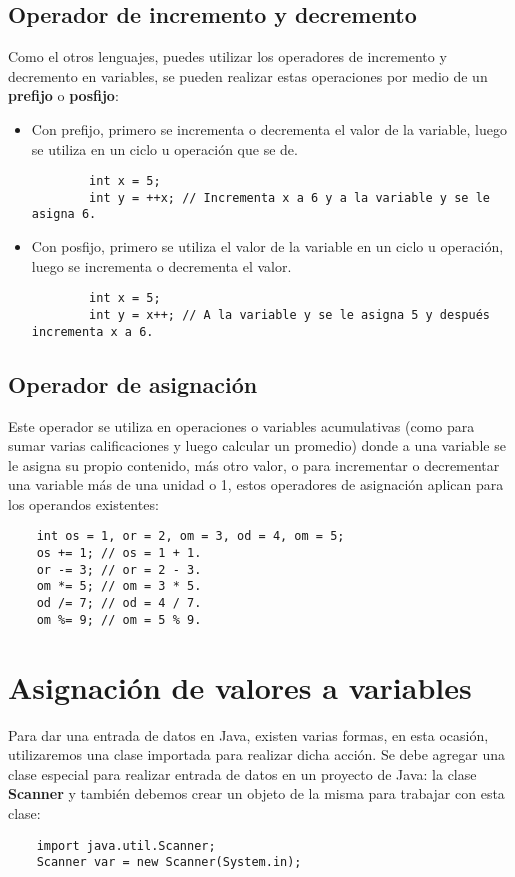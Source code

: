 \subsection{Operador de incremento y decremento}

Como el otros lenguajes, puedes utilizar los operadores de incremento y decremento en variables, se pueden realizar estas operaciones por medio de un \textbf{prefijo} o \textbf{posfijo}:
\begin{itemize}
    \item Con prefijo, primero se incrementa o decrementa el valor de la variable, luego se utiliza en un ciclo u operación que se de.
    \begin{lstlisting}
        int x = 5;
        int y = ++x; // Incrementa x a 6 y a la variable y se le asigna 6.
    \end{lstlisting}
    \item Con posfijo, primero se utiliza el valor de la variable en un ciclo u operación, luego se incrementa o decrementa el valor.
    \begin{lstlisting}
        int x = 5;
        int y = x++; // A la variable y se le asigna 5 y después incrementa x a 6.
    \end{lstlisting}
\end{itemize}


\subsection{Operador de asignación}
Este operador se utiliza en operaciones o variables acumulativas (como para sumar varias calificaciones y luego calcular un promedio) donde a una variable se le asigna su propio contenido, más otro valor, o para incrementar o decrementar una variable más de una unidad o 1, estos operadores de asignación aplican para los operandos existentes:
\begin{lstlisting}
    int os = 1, or = 2, om = 3, od = 4, om = 5;
    os += 1; // os = 1 + 1.
    or -= 3; // or = 2 - 3.
    om *= 5; // om = 3 * 5.
    od /= 7; // od = 4 / 7.
    om %= 9; // om = 5 % 9.
\end{lstlisting}



\section{Asignación de valores a variables}

Para dar una entrada de datos en Java, existen varias formas, en esta ocasión, utilizaremos una clase importada para realizar dicha acción. Se debe agregar una clase especial para realizar entrada de datos en un proyecto de Java: la clase \textbf{Scanner} y también debemos crear un objeto de la misma para trabajar con esta clase:
\begin{lstlisting}
    import java.util.Scanner;
    Scanner var = new Scanner(System.in);
\end{lstlisting}

